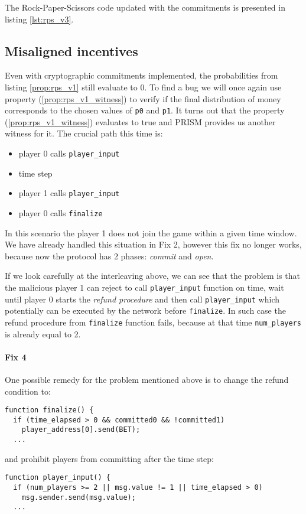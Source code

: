 The Rock-Paper-Scissors code updated with the commitments is presented in listing \ref{lst:rps_v3}.




\subsection{Misaligned incentives}

Even with cryptographic commitments implemented, the probabilities from listing \ref{prop:rps_v1} still evaluate to 0.
To find a bug we will once again use property (\ref{prop:rps_v1_witness}) to verify if the final distribution of money
corresponds to the chosen values of \lstinline{p0} and \lstinline{p1}.
It turns out that the property (\ref{prop:rps_v1_witness}) evaluates to true and PRISM provides us another witness 
for it. The crucial path this time is:
\begin{itemize}
\item player 0 calls \lstinline{player_input}
\item time step
\item player 1 calls \lstinline{player_input}
\item player 0 calls \lstinline{finalize}
\end{itemize}
In this scenario the player 1 does not join the game within a given time window.
We have already handled this situation in Fix 2, however this fix no longer works, because now the protocol
has 2 phases: \emph{commit} and \emph{open}.

If we look carefully at the interleaving above, we can see that the problem is
that the malicious player 1 can reject to call \lstinline{player_input} function on time, wait until player 0 starts
the \emph{refund procedure} and then call \lstinline{player_input} which potentially can be executed by the 
network before \lstinline{finalize}.
In such case the refund procedure from \lstinline{finalize} function fails, because at that time
\lstinline{num_players} is already equal to 2.

\paragraph{Fix 4}

One possible remedy for the problem mentioned above is to change the refund condition to:
\begin{lstlisting}
function finalize() {
  if (time_elapsed > 0 && committed0 && !committed1)
    player_address[0].send(BET);
  ...
\end{lstlisting}
and prohibit players from committing after the time step:
\begin{lstlisting}
function player_input() {
  if (num_players >= 2 || msg.value != 1 || time_elapsed > 0)
    msg.sender.send(msg.value);
  ...
\end{lstlisting}

